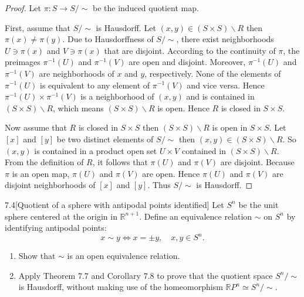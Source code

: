 \begin{proof}
	Let \( \pi: S \to S/\!\sim \) be the induced quotient map.

	First, assume that \( S/\!\sim \) is Hausdorff. Let \( (x, y) \in (S\times S)\smallsetminus R \) then \( \pi(x) \ne \pi(y) \). Due to Hausdorffness of \( S/\!\sim \), there exist neighborhoods \( U \ni \pi(x) \) and \( V \ni \pi(x) \) that are disjoint. According to the continuity of \( \pi \), the preimages \( \pi^{-1}(U) \) and \( \pi^{-1}(V) \) are open and disjoint. Moreover, \( \pi^{-1}(U) \) and \( \pi^{-1}(V) \) are neighborhoods of \( x \) and \( y \), respectively. None of the elements of \( \pi^{-1}(U) \) is equivalent to any element of \( \pi^{-1}(V) \) and vice versa. Hence \( \pi^{-1}(U) \times \pi^{-1}(V) \) is a neighborhood of \( (x, y) \) and is contained in \( (S \times S)\smallsetminus R \), which means \( (S\times S)\smallsetminus R \) is open. Hence \( R \) is closed in \( S\times S \).

	Now assume that \( R \) is closed in \( S\times S \) then \( (S\times S)\smallsetminus R \) is open in \( S\times S \). Let \( [x] \) and \( [y] \) be two distinct elements of \( S/\!\sim \) then \( (x, y) \in (S\times S)\smallsetminus R \). So \( (x, y) \) is contained in a product open set \( U\times V \) contained in \( (S\times S)\smallsetminus R \). From the definition of \( R \), it follows that \( \pi(U) \) and \( \pi(V) \) are disjoint. Because \( \pi \) is an open map, \( \pi(U) \) and \( \pi(V) \) are open. Hence \( \pi(U) \) and \( \pi(V) \) are disjoint neighborhoods of \( [x] \) and \( [y] \). Thus \( S/\!\sim \) is Hausdorff.
\end{proof}

\begin{problem}{7.4}[Quotient of a sphere with antipodal points identified]
Let \( S^{n} \) be the unit sphere centered at the origin in \( \mathbb{R}^{n+1} \). Define an equivalence relation \( \sim \) on \( S^{n} \) by identifying antipodal points:
\[
	x \sim y \Longleftrightarrow x = \pm y,\quad x, y\in S^{n}.
\]

\begin{enumerate}[label={(\alph*)},leftmargin=*]
	\item Show that \( \sim \) is an open equivalence relation.
	\item Apply Theorem 7.7 and Corollary 7.8 to prove that the quotient space \( S^{n}/\!\sim \) is Hausdorff, without making use of the homeomorphism \( \mathbb{R}P^{n} \simeq S^{n}/\!\sim \).
\end{enumerate}
\end{problem}

